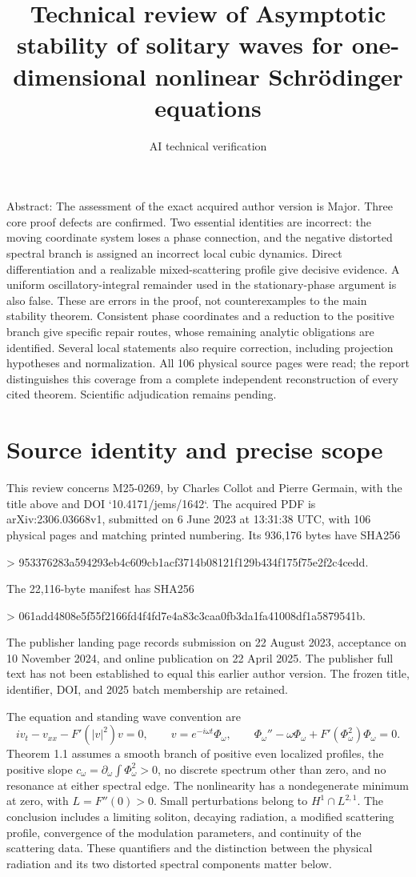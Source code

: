 \documentclass[10pt]{article}
\title{Technical review of
Asymptotic stability of solitary waves for one-dimensional nonlinear Schrödinger equations}
\author{AI technical verification}
\date{}
\begin{document}
\maketitle
Abstract: The assessment of the exact acquired author version is Major. Three core proof defects are confirmed. Two essential identities are incorrect: the moving coordinate system loses a phase connection, and the negative distorted spectral branch is assigned an incorrect local cubic dynamics. Direct differentiation and a realizable mixed-scattering profile give decisive evidence. A uniform oscillatory-integral remainder used in the stationary-phase argument is also false. These are errors in the proof, not counterexamples to the main stability theorem. Consistent phase coordinates and a reduction to the positive branch give specific repair routes, whose remaining analytic obligations are identified. Several local statements also require correction, including projection hypotheses and normalization. All 106 physical source pages were read; the report distinguishes this coverage from a complete independent reconstruction of every cited theorem. Scientific adjudication remains pending.\par
\section*{Source identity and precise scope}
This review concerns M25-0269, by Charles Collot and Pierre Germain, with the title above and DOI `10.4171/jems/1642`. The acquired PDF is arXiv:2306.03668v1, submitted on 6 June 2023 at 13:31:38 UTC, with 106 physical pages and matching printed numbering. Its 936,176 bytes have SHA256\par
> 953376283a594293eb4c609cb1acf3714b08121f129b434f175f75e2f2c4cedd.\par
The 22,116-byte manifest has SHA256\par
> 061add4808e5f55f2166fd4f4fd7e4a83c3caa0fb3da1fa41008df1a5879541b.\par
The publisher landing page records submission on 22 August 2023, acceptance on 10 November 2024, and online publication on 22 April 2025. The publisher full text has not been established to equal this earlier author version. The frozen title, identifier, DOI, and 2025 batch membership are retained.\par
The equation and standing wave convention are \[iv_t-v_{xx}-F'(|v|^2)v=0,\qquad
 v=e^{-i\omega t}\Phi_\omega,\qquad
 \Phi_\omega''-\omega\Phi_\omega+F'(\Phi_\omega^2)\Phi_\omega=0.\] Theorem 1.1 assumes a smooth branch of positive even localized profiles, the positive slope \(c_\omega=\partial_\omega\int\Phi_\omega^2>0\), no discrete spectrum other than zero, and no resonance at either spectral edge. The nonlinearity has a nondegenerate minimum at zero, with \(L=F''(0)>0\). Small perturbations belong to \(H^1\cap L^{2,1}\). The conclusion includes a limiting soliton, decaying radiation, a modified scattering profile, convergence of the modulation parameters, and continuity of the scattering data. These quantifiers and the distinction between the physical radiation and its two distorted spectral components matter below.\par
\end{document}
